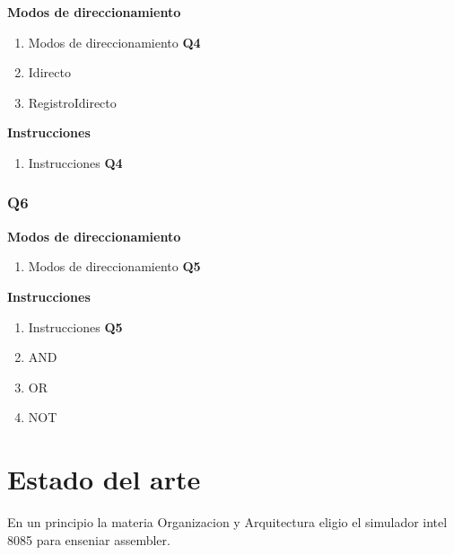 \textbf{Modos de direccionamiento}
\begin{enumerate}
\item Modos de direccionamiento \textbf{Q4}
\item Idirecto
\item RegistroIdirecto
\end{enumerate}

\textbf{Instrucciones}
\begin{enumerate}
\item Instrucciones \textbf{Q4}
\end{enumerate}

\subsubsection{Q6}

\textbf{Modos de direccionamiento}
\begin{enumerate}
\item Modos de direccionamiento \textbf{Q5}
\end{enumerate}

\textbf{Instrucciones}
\begin{enumerate}
\item Instrucciones \textbf{Q5}
\item AND
\item OR
\item NOT
\end{enumerate}


\section{Estado del arte}

En un principio la materia Organizacion y Arquitectura eligio el simulador intel 8085 para enseniar assembler.

